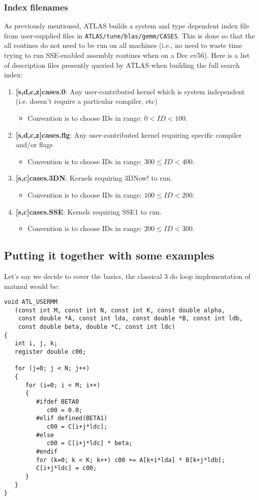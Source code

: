 \documentclass[11pt]{article}
\begin{document}
\subsubsection{Index filenames}
\label{sec-index}
As previously mentioned, ATLAS builds a system and type dependent index
file from user-supplied files in {\tt ATLAS/tune/blas/gemm/CASES}.  This
is done so that the all routines do not need to be run on all machines
(i.e., no need to waste time trying to run SSE-enabled assembly routines
when on a Dec ev56).  Here is a list of description files presently queried
by ATLAS when building the full search index:
\begin{enumerate}
 \item {\bf [s,d,c,z]cases.0}:  Any user-contributed kernel which is system
       independent (i.e. doesn't require a particular compiler, etc)
       \begin{itemize}
       \item Convention is to choose IDs in range: $0 < ID < 100$.
       \end{itemize}
 \item {\bf [s,d,c,z]cases.flg}: Any user-contributed kernel requiring specific
       compiler and/or flags
       \begin{itemize}
       \item Convention is to choose IDs in range: $300 \leq ID < 400$.
       \end{itemize}
 \item {\bf [s,c]cases.3DN}: Kernels requiring 3DNow! to run.
       \begin{itemize}
       \item Convention is to choose IDs in range: $100 \leq ID < 200$.
       \end{itemize}
 \item {\bf [s,c]cases.SSE}: Kernels requiring SSE1 to run.
       \begin{itemize}
       \item Convention is to choose IDs in range: $200 \leq ID < 300$.
       \end{itemize}
\end{enumerate}

\subsection{Putting it together with some examples}

Let's say we decide to cover the basics, the classical 3 do loop
implementation of matmul would be:
\begin{verbatim}
void ATL_USERMM
   (const int M, const int N, const int K, const double alpha,
    const double *A, const int lda, const double *B, const int ldb,
    const double beta, double *C, const int ldc)
{
   int i, j, k;
   register double c00;

   for (j=0; j < N; j++)
   {
      for (i=0; i < M; i++)
      {
         #ifdef BETA0
            c00 = 0.0;
         #elif defined(BETA1)
            c00 = C[i+j*ldc];
         #else
            c00 = C[i+j*ldc] * beta;
         #endif
         for (k=0; k < K; k++) c00 += A[k+i*lda] * B[k+j*ldb];
         C[i+j*ldc] = c00;
      }
   }
}
\end{verbatim}
\end{document}
